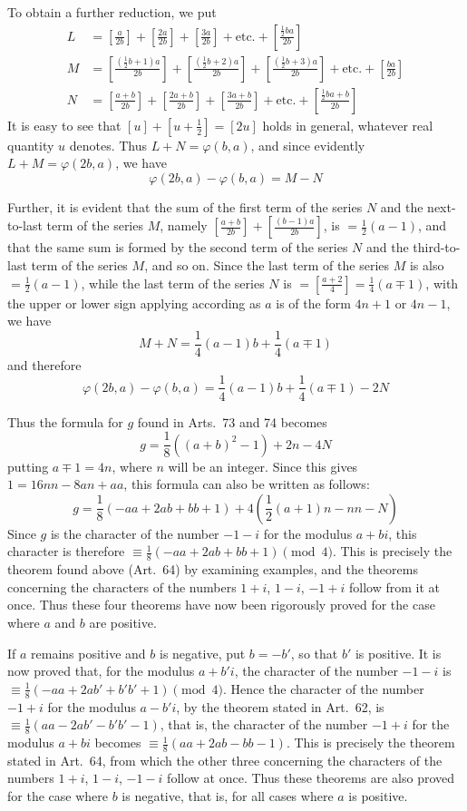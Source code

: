 To obtain a further reduction, we put
\[
\begin{aligned}
L&=\left[\frac{a}{2b}\right]+\left[\frac{2a}{2b}\right]+\left[\frac{3a}{2b}\right]+\text{etc.}+\left[\frac{\frac12ba}{2b}\right]\\
M&=\left[\frac{(\frac12b+1)a}{2b}\right]+\left[\frac{(\frac12b+2)a}{2b}\right]+\left[\frac{(\frac12b+3)a}{2b}\right]+\text{etc.}+\left[\frac{ba}{2b}\right]\\
N&=\left[\frac{a+b}{2b}\right]+\left[\frac{2a+b}{2b}\right]+\left[\frac{3a+b}{2b}\right]+\text{etc.}+\left[\frac{\frac12ba+b}{2b}\right]
\end{aligned}
\]
It is easy to see that $[u]+[u+\frac12]=[2u]$ holds in general, whatever real quantity $u$ denotes. Thus $L+N=\varphi(b,a)$, and since evidently $L+M=\varphi(2b,a)$, we have
\[
\varphi(2b,a)-\varphi(b,a)=M-N
\]

Further, it is evident that the sum of the first term of the series $N$ and the next-to-last term of the series $M$, namely $\left[\frac{a+b}{2b}\right]+\left[\frac{(b-1)a}{2b}\right]$, is $=\frac12(a-1)$, and that the same sum is formed by the second term of the series $N$ and the third-to-last term of the series $M$, and so on. Since the last term of the series $M$ is also $=\frac12(a-1)$, while the last term of the series $N$ is $=\left[\frac{a+2}{4}\right]=\frac14(a\mp1)$, with the upper or lower sign applying according as $a$ is of the form $4n+1$ or $4n-1$, we have
\[
M+N=\frac14(a-1)b+\frac14(a\mp1)
\]
and therefore
\[
\varphi(2b,a)-\varphi(b,a)=\frac14(a-1)b+\frac14(a\mp1)-2N
\]

%
Thus the formula for $g$ found in Arts.~73 and 74 becomes
\[
g=\frac18((a+b)^2-1)+2n-4N
\]
putting $a\mp1=4n$, where $n$ will be an integer. Since this gives $1=16nn-8an+aa$, this formula can also be written as follows:
\[
g=\frac18(-aa+2ab+bb+1)+4(\frac12(a+1)n-nn-N)
\]
Since $g$ is the character of the number $-1-i$ for the modulus $a+bi$, this character is therefore $\equiv\frac18(-aa+2ab+bb+1)\pmod4$. This is precisely the theorem found above (Art.~64) by examining examples, and the theorems concerning the characters of the numbers $1+i$, $1-i$, $-1+i$ follow from it at once. Thus these four theorems have now been rigorously proved for the case where $a$ and $b$ are positive.

If $a$ remains positive and $b$ is negative, put $b=-b'$, so that $b'$ is positive. It is now proved that, for the modulus $a+b'i$, the character of the number $-1-i$ is $\equiv\frac18(-aa+2ab'+b'b'+1)\pmod4$. Hence the character of the number $-1+i$ for the modulus $a-b'i$, by the theorem stated in Art.~62, is $\equiv\frac18(aa-2ab'-b'b'-1)$, that is, the character of the number $-1+i$ for the modulus $a+bi$ becomes $\equiv\frac18(aa+2ab-bb-1)$. This is precisely the theorem stated in Art.~64, from which the other three concerning the characters of the numbers $1+i$, $1-i$, $-1-i$ follow at once. Thus these theorems are also proved for the case where $b$ is negative, that is, for all cases where $a$ is positive.

